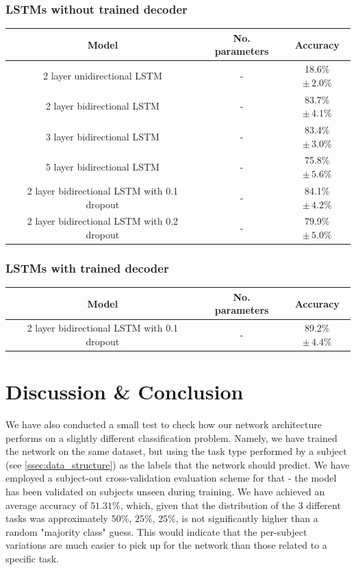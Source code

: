\documentclass{article}
\begin{document}
\subsubsection{LSTMs without trained decoder}
\begin{center}
\begin{tabular}{ c|c|c } 
 Model & No. parameters & Accuracy \\ 
 \hline
 2 layer unidirectional LSTM & - & 18.6\% $\pm \, 2.0\% $\\ 
 2 layer bidirectional LSTM & - & 83.7\% $\pm \, 4.1\%$ \\ 
 3 layer bidirectional LSTM & - & 83.4\% $\pm \, 3.0\%$ \\ 
 5 layer bidirectional LSTM & - & 75.8\% $\pm \, 5.6\%$ \\
 2 layer bidirectional LSTM with 0.1 dropout & - & 84.1\% $\pm \, 4.2\%$ \\
 2 layer bidirectional LSTM with 0.2 dropout & - & 79.9\% $\pm \, 5.0\%$ \\
\end{tabular}
\end{center}
\subsubsection{LSTMs with trained decoder}
\begin{center}
\begin{tabular}{ c|c|c } 
 Model & No. parameters & Accuracy \\ 
 \hline
 2 layer bidirectional LSTM with 0.1 dropout & - & 89.2\% $\pm \, 4.4\%$ \\
\end{tabular}
\end{center}

\section{Discussion \& Conclusion}
We have also conducted a small test to check how our network architecture performs on a slightly different classification problem. Namely, we have trained the network on the same dataset, but using the task type performed by a subject (see \ref{ssec:data_structure}) as the labels that the network should predict. We have employed a subject-out cross-validation evaluation scheme for that - the model has been validated on subjects unseen during training. We have achieved an average accuracy of $51.31\%$, which, given that the distribution of the 3 different tasks was approximately $50\%$, $25\%$, $25\%$, is not significantly higher than a random "majority class" guess. This would indicate that the per-subject variations are much easier to pick up for the network than those related to a specific task.
\end{document}
